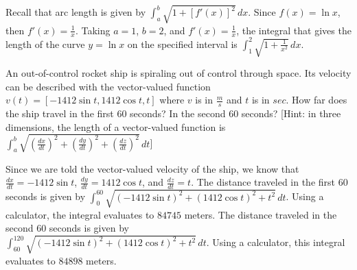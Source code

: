 \begin{Answer}[ref=length3]
Recall that arc length is given by $\int_a^b \sqrt{1 + [f'(x)]^2}\,dx$. 
Since $f(x) = \ln{x}$, then $f'(x) = \frac{1}{x}$. Taking $a = 1$, 
$b = 2$, and $f'(x) = \frac{1}{x}$, the integral that gives the length 
of the curve $y = \ln{x}$ on the specified interval is $\int_1^2 
\sqrt{1+\frac{1}{x^2}}\,dx$. 
\end{Answer}

\begin{Exercise}[label = length4]
	An out-of-control rocket ship is spiraling out of control through 
	space. Its velocity can be described with the vector-valued function 
	$v(t) = [-1412\sin{t}, 1412\cos{t}, t]$ where $v$ is in $\frac{m}{s}$ 
	and $t$ is in $sec$. How far does the ship travel in the first 60 
	seconds? In the second 60 seconds? [Hint: in three dimensions, the 
	length of a vector-valued function is $\int_a^b 
	\sqrt{(\frac{dx}{dt})^2 + (\frac{dy}{dt})^2 + (\frac{dz}{dt})^2}\,dt$]
\end{Exercise}

\begin{Answer}[ref= length4]
	Since we are told the vector-valued velocity of the ship, we know 
	that $\frac{dx}{dt} = -1412\sin{t}$, $\frac{dy}{dt} = 1412\cos{t}$, 
	and $\frac{dz}{dt} = t$. The distance traveled in the first 60 
	seconds is given by $\int_0^{60} \sqrt{(-1412\sin{t})^2 + 
	(1412\cos{t})^2 + t^2}\,dt$. Using a calculator, the integral 
	evaluates to $84745$ meters. The distance traveled in the second 60 
	seconds is given by \\$\int_{60}^{120} \sqrt{(-1412\sin{t})^2 + 
	(1412\cos{t})^2 + t^2}\,dt$. Using a calculator, this integral 
	evaluates to $84898$ meters.
\end{Answer}






